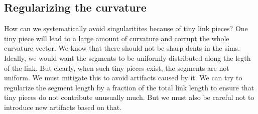 \documentclass[nofootinbib,preprint,floatfix,titlepage,endfloats,superscriptaddress]{revtex4} %
\begin{document}
\subsection{Regularizing the curvature}
How can we systematically avoid singularitites because of tiny link pieces? One tiny piece will lead to a large amount of curvature and corrupt the whole curvature vector. We know that there should not be sharp dents in the sims. Ideally, we would want the segments to be uniformly distributed along the legth of the link. But clearly, when such tiny pieces exist, the segments are not uniform. We must mitigate this to avoid artifacts caused by it. 
We can try to regularize the segment length by a fraction of the total link length to ensure that tiny pieces do not contribute unusually much. But we must also be careful not to introduce new artifacts based on that. 
\end{document}
